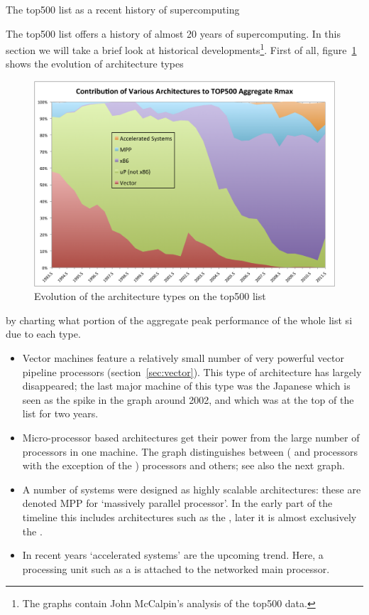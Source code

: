  {The top500 list as a recent history of supercomputing}

The top500 list offers a history of almost 20 years of
supercomputing. In this section we will take a brief look at
historical developments\footnote{The graphs contain John McCalpin's
  analysis of the top500 data.}. First of all,
figure~\ref{fig:top500-types} shows the evolution of architecture types
\begin{figure}[ht]
  \includegraphics[scale=.6]{graphics-public/top500/ChartByArchitecture}
  \caption{Evolution of the architecture types on the top500 list}
  \label{fig:top500-types}
\end{figure}
by charting what portion of the aggregate peak performance of the
whole list si due to each type.
\begin{itemize}
\item Vector machines feature a relatively small number of very powerful vector
  pipeline processors (section~\ref{sec:vector}). This type of
  architecture has largely disappeared; the last major machine of this
  type was the Japanese  which is seen as
  the spike in the graph around 2002, and which was at the top of the
  list for two years.
\item Micro-processor based architectures get their power from the
  large number of processors in one machine. The graph distinguishes
  between  ( and 
  processors with the exception of the )
  processors and others; see also the next graph.
\item A number of systems were designed as highly scalable
  architectures: these are denoted MPP for `massively parallel
  processor'. In the early part of the timeline this includes
  architectures such as the , later it
  is almost exclusively the .
\item In recent years `accelerated systems' are the upcoming
  trend. Here, a processing unit such as a  is attached
  to the networked main processor.
\end{itemize}
